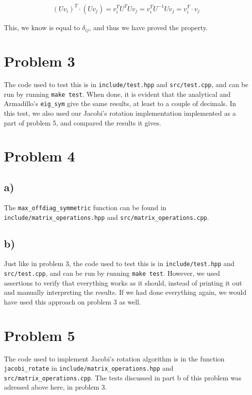 \documentclass[english,notitlepage]{revtex4-1}  %
\begin{document}
\begin{align*}
\left(U v_i \right)^T \cdot (U v_j) = v_i^T U^T U v_j = v_i^T U^{-1} U v_j = v_i^T \cdot v_j
\end{align*}

This, we know is equal to $\delta_{ij}$, and thus we have proved the property.

\section*{Problem 3}

The code used to test this is in \lstinline{include/test.hpp} and \lstinline{src/test.cpp}, and can be run by running \lstinline{make test}. When done, it is evident that the analytical and Armadillo's \lstinline{eig_sym} give the same results, at least to a couple of decimals. In this test, we also used our Jacobi's rotation implementation implemented as a part of problem 5, and compared the results it gives.

\section*{Problem 4}

\subsection*{a)}
The \lstinline{max_offdiag_symmetric} function can be found in \lstinline{include/matrix_operations.hpp} and \lstinline{src/matrix_operations.cpp}.

\subsection*{b)}
Just like in problem 3, the code used to test this is in \lstinline{include/test.hpp} and \lstinline{src/test.cpp}, and can be run by running \lstinline{make test}. However, we used assertions to verify that everything works as it should, instead of printing it out and manually interpreting the results. If we had done everything again, we would have used this approach on problem 3 as well.

\section*{Problem 5}
The code used to implement Jacobi's rotation algorithm is in the function \lstinline{jacobi_rotate} in \lstinline{include/matrix_operations.hpp} and \lstinline{src/matrix_operations.cpp}. The tests discussed in part b of this problem was adressed above here, in problem 3.
\end{document}
